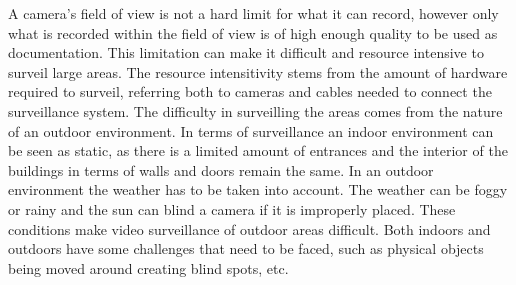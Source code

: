 
A camera's field of view is not a hard limit for what it can record, however only what is recorded within the field of view is of high enough quality to be used as documentation.
This limitation can make it difficult and resource intensive to surveil large areas.
The resource intensitivity stems from the amount of hardware required to surveil, referring both to cameras and cables needed to connect the surveillance system.
The difficulty in surveilling the areas comes from the nature of an outdoor environment.
In terms of surveillance an indoor environment can be seen as static, as there is a limited amount of entrances and the interior of the buildings in terms of walls and doors remain the same.
In an outdoor environment the weather has to be taken into account.
The weather can be foggy or rainy and the sun can blind a camera if it is improperly placed.
These conditions make video surveillance of outdoor areas difficult.
Both indoors and outdoors have some challenges that need to be faced, such as physical objects being moved around creating blind spots, etc.
